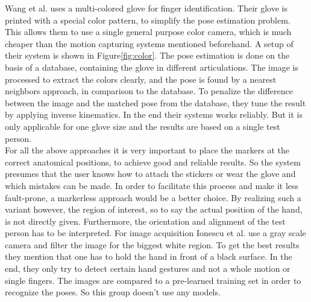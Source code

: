Wang et al. uses a multi-colored glove for finger identification. Their glove is printed with a special color pattern, to simplify the pose estimation problem. This allows them to use a single general purpose color camera, which is much cheaper than the motion capturing systems mentioned beforehand. A setup of their system is shown in Figure\ref{fig:color}. The pose estimation is done on the basis of a database, containing the glove in different articulations. The image is processed to extract the colors clearly, and the pose is found by a nearest neighbors approach, in comparison to the database. To penalize the difference between the image and the matched pose from the database, they tune the result by applying inverse kinematics. In the end their systems works reliably. But it is only applicable for one glove size and the results are based on a single test person.\\
For all the above approaches it is very important to place the markers at the correct anatomical positions, to achieve good and reliable results. So the system presumes that the user knows how to attach the stickers or wear the glove and which mistakes can be made. In order to facilitate this process and make it less fault-prone, a markerless approach would be a better choice.
By realizing such a variant however, the region of interest, so to say the actual position of the hand, is not directly given. Furthermore, the orientation and alignment of the test person has to be interpreted. For image acquisition Ionescu et al. use a gray scale camera and filter the image for the biggest white region. To get the best results they mention that one has to hold the hand in front of a black surface. In the end, they only try to detect certain hand gestures and not a whole motion or single fingers. The images are compared to a pre-learned training set in order to recognize the poses. So this group doesn't use any models.\\
